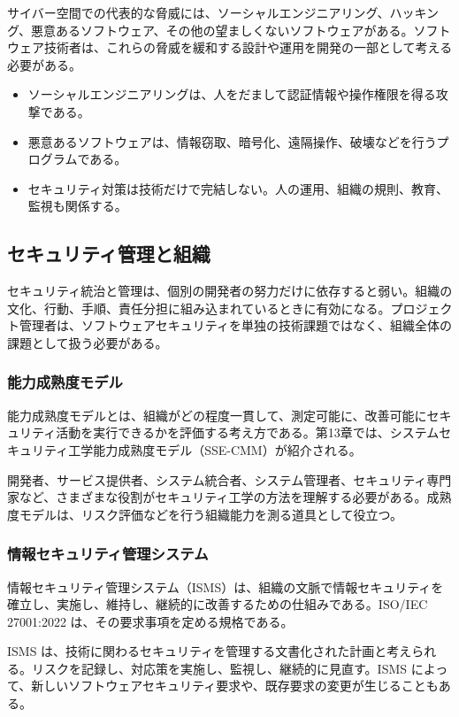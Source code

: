 \documentclass[a4paper,11pt]{ltjsarticle}
\numberwithin{figure}{section}
\numberwithin{table}{section}
\begin{document}
サイバー空間での代表的な脅威には、ソーシャルエンジニアリング、ハッキング、悪意あるソフトウェア、その他の望ましくないソフトウェアがある。ソフトウェア技術者は、これらの脅威を緩和する設計や運用を開発の一部として考える必要がある。

\begin{itemize}[leftmargin=2em]
\item ソーシャルエンジニアリングは、人をだまして認証情報や操作権限を得る攻撃である。
\item 悪意あるソフトウェアは、情報窃取、暗号化、遠隔操作、破壊などを行うプログラムである。
\item セキュリティ対策は技術だけで完結しない。人の運用、組織の規則、教育、監視も関係する。
\end{itemize}
\subsection{セキュリティ管理と組織}
セキュリティ統治と管理は、個別の開発者の努力だけに依存すると弱い。組織の文化、行動、手順、責任分担に組み込まれているときに有効になる。プロジェクト管理者は、ソフトウェアセキュリティを単独の技術課題ではなく、組織全体の課題として扱う必要がある。

\subsubsection{能力成熟度モデル}
能力成熟度モデルとは、組織がどの程度一貫して、測定可能に、改善可能にセキュリティ活動を実行できるかを評価する考え方である。第13章では、システムセキュリティ工学能力成熟度モデル（SSE-CMM）が紹介される。

開発者、サービス提供者、システム統合者、システム管理者、セキュリティ専門家など、さまざまな役割がセキュリティ工学の方法を理解する必要がある。成熟度モデルは、リスク評価などを行う組織能力を測る道具として役立つ。

\subsubsection{情報セキュリティ管理システム}
情報セキュリティ管理システム（ISMS）は、組織の文脈で情報セキュリティを確立し、実施し、維持し、継続的に改善するための仕組みである。ISO/IEC 27001:2022 は、その要求事項を定める規格である。

ISMS は、技術に関わるセキュリティを管理する文書化された計画と考えられる。リスクを記録し、対応策を実施し、監視し、継続的に見直す。ISMS によって、新しいソフトウェアセキュリティ要求や、既存要求の変更が生じることもある。
\end{document}
